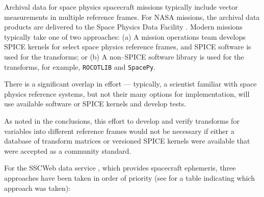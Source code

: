 \documentclass[draft]{agujournal2019}
\begin{document}
Archival data for space physics spacecraft missions typically include vector measurements in multiple reference frames. For NASA missions, the archival data products are delivered to the Space Physics Data Facility \cite{SPDF}. Modern missions typically take one of two approaches: (a) A mission operations team develops SPICE kernels for select space physics reference frames, and SPICE software is used for the transforms; or (b) A non--SPICE software library is used for the transforms, for example, \texttt{ROCOTLIB} and \texttt{SpacePy}. 

There is a significant overlap in effort --- typically, a scientist familiar with space physics reference systems, but not their many options for implementation, will use available software or SPICE kernels and develop tests. 

As noted in the conclusions, this effort to develop and verify transforms for variables into different reference frames would not be necessary if either a database of transform matrices or versioned SPICE kernels were available that were accepted as a community standard.

For the SSCWeb data service \cite{SSCWeb}, which provides spacecraft ephemeris, three approaches have been taken in order of priority (see  for a table indicating which approach was taken):
\end{document}
